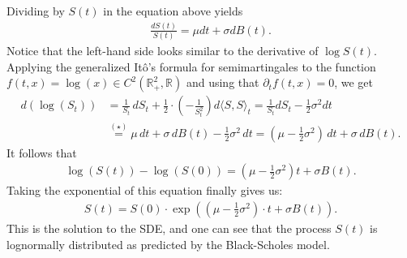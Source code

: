 \documentclass[11pt,a4paper, final]{article}
\begin{document}
Dividing by $S(t)$ in the equation above yields
\begin{align*}\frac{dS(t)}{S(t)}=\mu dt + \sigma dB(t).\tag{ $\star$}
 \end{align*}
Notice that the left-hand side looks similar to the derivative of $\log{S(t)}$.\\
Applying the generalized Itô's formula for semimartingales to the function $f(t,x)=\log(x)\in C^2(\mathbb{R}_+^2,\mathbb{R})$ and using that $\partial_t f(t,x)=0$, we get 
\begin{align*}
d(\log(S_t))&=\frac{1}{S_t} \, dS_t + \frac{1}{2}\cdot \left(-\frac{1}{S^2_t} \right) d\langle S,S\rangle_t 
= \frac{1}{S_t} dS_t -\frac{1}{2} \sigma^2 dt \\
&\stackrel{(\star)}{=} \mu \, dt + \sigma \, dB(t) -\frac{1}{2} \sigma^2 \, dt
=\left(\mu -\frac{1}{2} \sigma^2\right)\, dt + \sigma \, dB(t).
\end{align*}
It follows that
\begin{align*}\log(S(t))-\log(S(0)) =\left(\mu -\frac{1}{2} \sigma^2\right)t + \sigma B(t).
\end{align*}
Taking the exponential of this equation finally gives us:
\begin{align*}
S(t)=S(0) \cdot \exp\left( \left(\mu - \frac{1}{2}\sigma^2\right)\cdot t + \sigma B(t)\right).
\end{align*}
This is the solution to the SDE, and one can see that the process $S(t)$ is lognormally distributed as predicted by the Black-Scholes model.

\newpage
\end{document}
